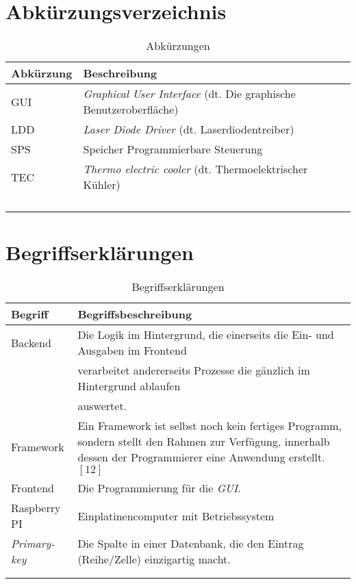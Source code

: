 \section*{Abkürzungsverzeichnis}

\begin{table}[H]
    \begin{tabular}{l|l}
         \textbf{Abkürzung}& \textbf{Beschreibung}\\
         \hline
         GUI&   \textit{Graphical User Interface} (dt. Die graphische Benutzeroberfläche)\\
         LDD&   \textit{Laser Diode Driver} (dt. Laserdiodentreiber)\\
         SPS&   Speicher Programmierbare Steuerung\\
         TEC&   \textit{Thermo electric cooler} (dt. Thermoelektrischer Kühler)\\
         & \\
         & \\
         & \\
         & \\
    \end{tabular}
    \caption{Abkürzungen}
    \label{tab:abkuerzungen}
\end{table}

\section*{Begriffserklärungen}
\begin{table}[H]
    \begin{tabular}{l|l}
         \textbf{Begriff}& \textbf{Begriffsbeschreibung}\\
         \hline
         Backend& Die Logik im Hintergrund, die einerseits die Ein- und Ausgaben im Frontend\\
         &verarbeitet andererseits Prozesse die gänzlich im Hintergrund ablaufen\\
         &auswertet.\\
         Framework& Ein Framework ist selbst noch kein fertiges Programm, sondern stellt den Rahmen zur Verfügung, innerhalb dessen der Programmierer eine Anwendung erstellt. $[12]$\\
         Frontend& Die Programmierung für die \textit{GUI}.\\
         Raspberry PI& Einplatinencomputer mit Betriebssystem\\
         \textit{Primary-key}&   Die Spalte in einer Datenbank, die den Eintrag (Reihe/Zelle) einzigartig macht.\\
         & \\
         & \\
    \end{tabular}
    \caption{Begriffserklärungen}
    \label{tab:begriffserklaerungen}
\end{table}